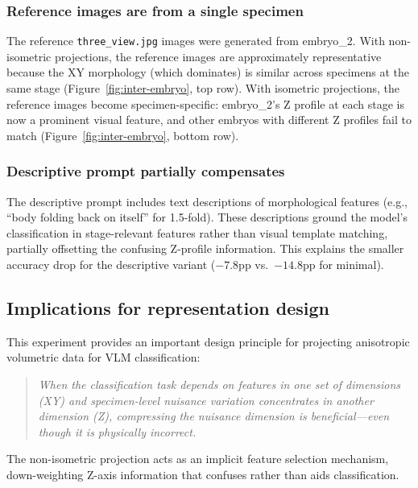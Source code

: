 \documentclass[11pt, a4paper]{article}
\begin{document}
\subsubsection{Reference images are from a single specimen}

The reference \texttt{three\_view.jpg} images were generated from embryo\_2.
With non-isometric projections, the reference images are approximately
representative because the XY morphology (which dominates) is similar across
specimens at the same stage (Figure~\ref{fig:inter-embryo}, top row).  With
isometric projections, the reference images become specimen-specific:
embryo\_2's Z profile at each stage is now a prominent visual feature, and
other embryos with different Z profiles fail to match
(Figure~\ref{fig:inter-embryo}, bottom row).

\subsubsection{Descriptive prompt partially compensates}

The descriptive prompt includes text descriptions of morphological features
(e.g., ``body folding back on itself'' for 1.5-fold).  These descriptions
ground the model's classification in stage-relevant features rather than visual
template matching, partially offsetting the confusing Z-profile information.
This explains the smaller accuracy drop for the descriptive variant ($-7.8$pp
vs.\ $-14.8$pp for minimal).

\subsection{Implications for representation design}

This experiment provides an important design principle for projecting
anisotropic volumetric data for VLM classification:

\begin{quote}
\itshape
When the classification task depends on features in one set of dimensions (XY)
and specimen-level nuisance variation concentrates in another dimension (Z),
compressing the nuisance dimension is beneficial---even though it is physically
incorrect.
\end{quote}

The non-isometric projection acts as an implicit feature selection mechanism,
down-weighting Z-axis information that confuses rather than aids
classification.

\end{document}
